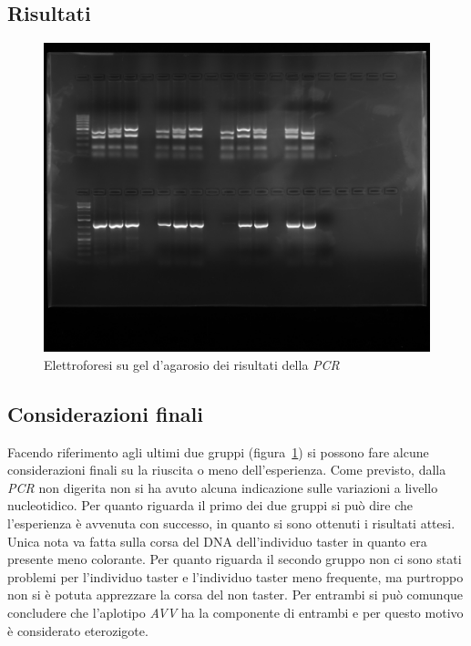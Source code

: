 	\subsection*{Risultati}
	\begin{figure}[H]
		\centering
		\includegraphics[width=\textwidth]{./Pics/RFLP/RFLP_gruppoD.jpg}
		\caption{Elettroforesi su gel d'agarosio dei risultati della \emph{PCR}}
		\label{fig10}
	\end{figure}

	\subsection*{Considerazioni finali}
	Facendo riferimento agli ultimi due gruppi (figura~\ref{fig10}) si possono fare alcune considerazioni finali su la riuscita o meno dell'esperienza. 
	Come previsto, dalla \emph{PCR} non digerita non si ha avuto alcuna indicazione sulle variazioni a livello nucleotidico.
	Per quanto riguarda il primo dei due gruppi si può dire che l'esperienza è avvenuta con successo, in quanto si sono ottenuti i risultati attesi. 
	Unica nota va fatta sulla corsa del DNA dell'individuo taster in quanto era presente meno colorante. 
	Per quanto riguarda il secondo gruppo non ci sono stati problemi per l'individuo taster e l'individuo taster meno frequente, ma purtroppo non si è potuta apprezzare la corsa del non taster. 
	Per entrambi si può comunque concludere che l'aplotipo \emph{AVV} ha la componente di entrambi e per questo motivo è considerato eterozigote.
